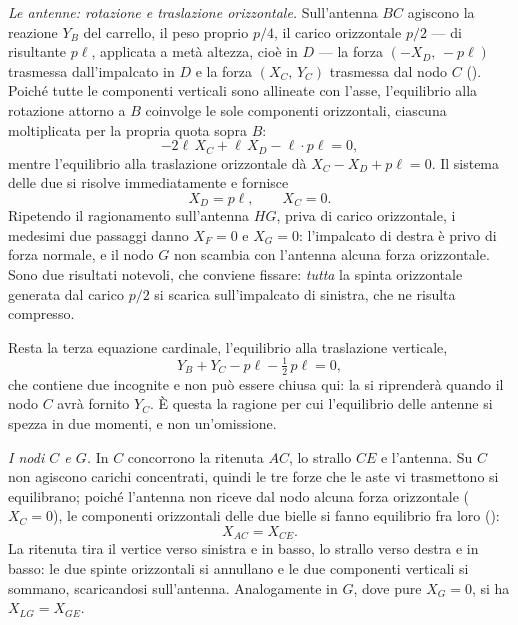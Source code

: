 



\medskip
\noindent\emph{Le antenne: rotazione e traslazione
orizzontale.}
Sull'antenna $BC$ agiscono la reazione $Y_B$ del carrello,
il peso proprio $p/4$, il carico orizzontale $p/2$ ---
di risultante $p\ell$, applicata a metà altezza, cioè in
$D$ --- la forza $(-X_D,\,-p\ell)$ trasmessa dall'impalcato
in $D$ e la forza $(X_C,\,Y_C)$ trasmessa dal nodo $C$
(). Poiché tutte le componenti
verticali sono allineate con l'asse, l'equilibrio alla
rotazione attorno a $B$ coinvolge le sole componenti
orizzontali, ciascuna moltiplicata per la propria quota
sopra $B$:
\[
	-2\ell\,X_C + \ell\,X_D - \ell\cdot p\ell = 0 ,
\]
mentre l'equilibrio alla traslazione orizzontale dà
$X_C - X_D + p\ell = 0$. Il sistema delle due si risolve
immediatamente e fornisce
\[
	X_D = p\ell , \qquad X_C = 0 .
\]
Ripetendo il ragionamento sull'antenna $HG$, priva di carico
orizzontale, i medesimi due passaggi danno $X_F = 0$ e
$X_G = 0$: l'impalcato di destra è privo di forza normale, e
il nodo $G$ non scambia con l'antenna alcuna forza
orizzontale. Sono due risultati notevoli, che conviene
fissare: \emph{tutta} la spinta orizzontale generata dal
carico $p/2$ si scarica sull'impalcato di sinistra, che ne
risulta compresso.

Resta la terza equazione cardinale, l'equilibrio alla
traslazione verticale,
\[
	Y_B + Y_C - p\ell - \tfrac{1}{2}\,p\ell = 0 ,
\]
che contiene due incognite e non può essere chiusa qui: la
si riprenderà quando il nodo $C$ avrà fornito $Y_C$. È
questa la ragione per cui l'equilibrio delle antenne si
spezza in due momenti, e non un'omissione.





\medskip
\noindent\emph{I nodi $C$ e $G$.}
In $C$ concorrono la ritenuta $AC$, lo strallo $CE$ e
l'antenna. Su $C$ non agiscono carichi concentrati, quindi
le tre forze che le aste vi trasmettono si equilibrano;
poiché l'antenna non riceve dal nodo alcuna forza
orizzontale ($X_C = 0$), le componenti orizzontali delle due
bielle si fanno equilibrio fra loro
():
\[
	X_{AC} = X_{CE} .
\]
La ritenuta tira il vertice verso sinistra e in basso, lo
strallo verso destra e in basso: le due spinte orizzontali
si annullano e le due componenti verticali si sommano,
scaricandosi sull'antenna. Analogamente in $G$, dove pure
$X_G = 0$, si ha $X_{LG} = X_{GE}$.

